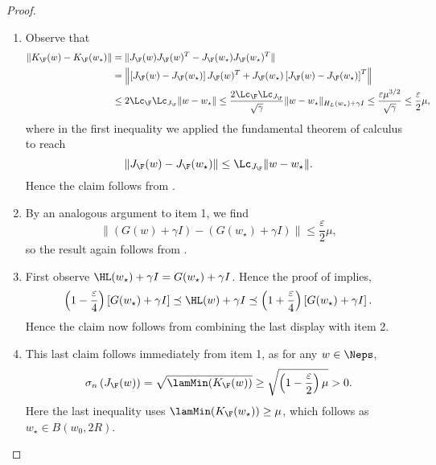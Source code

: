 \begin{proof}
\begin{enumerate}
    \item Observe that
    \begin{align*}
        \|K_\F(w)-K_\F(w_\star)\| &= \|J_{\F}(w)J_{\F}(w)^{T}-J_{\F}(w_\star)J_{\F}(w_\star)^{T}\| \\
                  &= \left\|\left[J_{\F}(w)-J_{\F}(w_\star)\right]J_{\F}(w)^{T}+J_{\F}(w_\star)\left[J_{\F}(w)-J_{\F}(w_\star)\right]^{T}\right\| \\
                  &\leq 2 \Lc_\F \Lc_{J_\F}\|w-w_\star\| \leq \frac{2 \Lc_\F \Lc_{J_\F}}{\sqrt{\gamma}}\|w-w_\star\|_{H_L(w_\star)+\gamma I} \leq \frac{\varepsilon\mu^{3/2}}{\sqrt{\gamma}} \leq \frac{\varepsilon}{2} \mu,
    \end{align*}
    where in the first inequality we applied the fundamental theorem of calculus to reach 
    \[
    \|J_{\F}(w)-J_{\F}(w_\star)\|\leq \Lc_{J_{\F}}\|w-w_\star\|.
    \]
    Hence the claim follows from .
    \item By an analogous argument to item 1, we find
    \[
    \left\|\left(G(w)+\gamma I\right)-\left(G(w_\star)+\gamma I\right)\right\| \leq \frac{\varepsilon}{2}\mu,
    \]
    so the result again follows from .
    \item First observe $\HL(w_\star)+\gamma I = G(w_\star)+\gamma I$. Hence the proof of  implies,
    \[
    \left(1-\frac{\varepsilon}{4}\right)\left[G(w_\star)
        +\gamma I\right]\preceq \HL(w)+\gamma I\preceq \left(1+\frac{\varepsilon}{4}\right)\left[G(w_\star)
        +\gamma I\right].
    \]
    Hence the claim now follows from combining the last display with item 2. 
    \item This last claim follows immediately from item 1, as for any $w\in \Neps$,
    \[
    \sigma_{n}\left(J_{\F}(w)\right) = \sqrt{\lamMin(K_\F(w))}\geq \sqrt{\left(1-\frac{\varepsilon}{2}\right)\mu}>0.
    \]   
    Here the last inequality uses $\lamMin(K_\F(w_\star))\geq \mu$, which follows as $w_\star\in B(w_0,2R)$.
\end{enumerate}

\end{proof}

